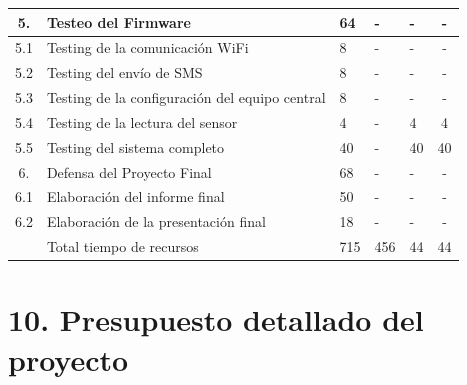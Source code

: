 \documentclass[11pt]{charter}
\begin{document}
\begin{table}
\label{tab:recursos}
\centering
\begin{tabularx}{\linewidth}{@{}|c|X|X|X|X|c|@{}}
\hline
 5.     & Testeo del Firmware                                                   & 64    &     - &     - & - \\ \hline
 5.1    & Testing de la comunicación WiFi                                       & 8     &     - &     - & - \\ \hline
 5.2    & Testing del envío de SMS                                              & 8     &     - &     - & - \\ \hline
 5.3    & Testing de la configuración del equipo central                        & 8     &     - &     - & - \\ \hline
 5.4    & Testing de la lectura del sensor                                      & 4     &     - &     4 & 4 \\ \hline
 5.5    & Testing del sistema completo                                          & 40    &     - &    40 &40 \\ \hline
 6.     & Defensa del Proyecto Final                                            & 68    &     - &     - & - \\ \hline
 6.1    & Elaboración del informe final                                         & 50    &     - &     - & - \\ \hline
 6.2    & Elaboración de la presentación final                                  & 18    &     - &     - & - \\ \hline
        & Total tiempo de recursos                                              & 715   &    456&    44 &44 \\ \hline
\end{tabularx}%
\end{table}



\section{10. Presupuesto detallado del proyecto}
\label{sec:presupuesto}
\end{document}
